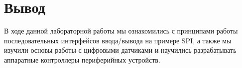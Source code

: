 \section{Вывод}
В ходе данной лабораторной работы мы ознакомились с принципами работы последовательных
интерфейсов ввода/вывода на примере SPI, а также мы изучили основы работы с
цифровыми датчиками и научились разрабатывать аппаратные контроллеры периферийных
устройств.


